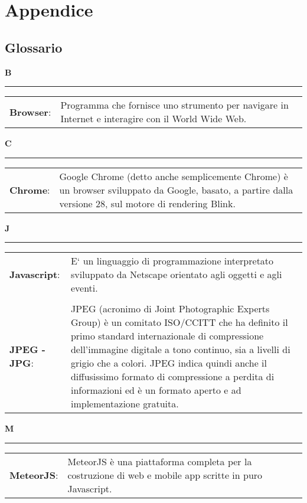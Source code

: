\newpage
\section{Appendice}

\subsection{Glossario}
\hfill\Huge{\textbf{B}}\\
\rule{16cm}{.6pt}
\normalsize
	\begin{longtable}{p{} p{}} 
	    \\
		    \textbf{Browser}: &	Programma che fornisce uno strumento per navigare in Internet e interagire con il World Wide Web.\\
	\end{longtable}

\hfill\Huge{\textbf{C}}\\
\rule{16cm}{.6pt}
\normalsize
	\begin{longtable}{p{} p{}} 
	    \\
		    \textbf{Chrome}: & Google Chrome (detto anche semplicemente Chrome) è un browser sviluppato da Google, basato, a partire dalla versione 28, sul motore di rendering Blink.\\
	\end{longtable}
	
\hfill\Huge{\textbf{J}}\\
\rule{16cm}{.6pt}
\normalsize
	\begin{longtable}{p{} p{}} 
	    \\
		    \textbf{Javascript}: & E` un linguaggio di programmazione interpretato sviluppato da Netscape orientato agli oggetti e agli eventi.\\
		    \\
		    \textbf{JPEG - JPG}: & JPEG (acronimo di Joint Photographic Experts Group) è un comitato ISO/CCITT che ha definito il primo standard internazionale di compressione dell'immagine digitale a tono continuo, sia a livelli di grigio che a colori. JPEG indica quindi anche il diffusissimo formato di compressione a perdita di informazioni ed è un formato aperto e ad implementazione gratuita.
	\end{longtable}
	
\hfill\Huge{\textbf{M}}\\
\rule{16cm}{.6pt}
\normalsize
	\begin{longtable}{p{} p{}} 
	    \\
		    \textbf{MeteorJS}: & MeteorJS è una piattaforma completa per la costruzione di web e mobile app scritte in puro Javascript.\\
	\end{longtable}
	
